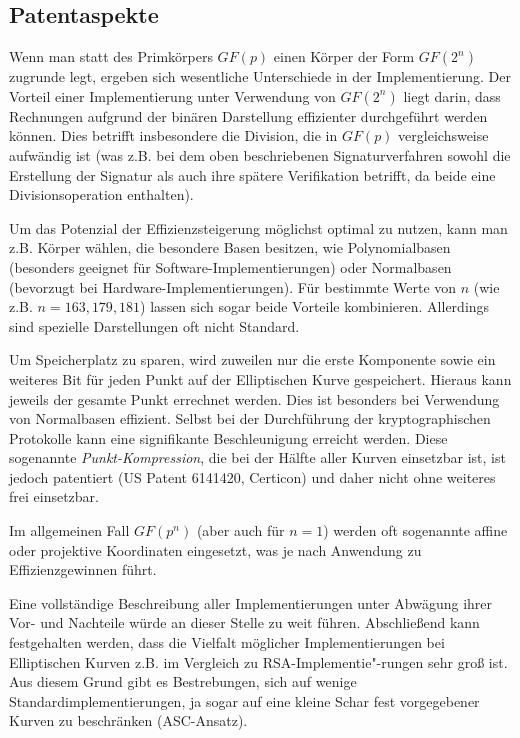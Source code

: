 \begin{refsegment}
\newpage
\section{Patentaspekte}

Wenn man statt des Primkörpers $GF(p)$ einen Körper der Form $GF(2^n)$ zugrunde legt, ergeben sich wesentliche Unterschiede in der Implementierung. Der Vorteil einer Implementierung unter Verwendung von $GF(2^n)$ liegt darin, dass Rechnungen aufgrund der binären Darstellung effizienter durchgeführt werden können. Dies betrifft insbesondere die Division, die in $GF(p)$ vergleichsweise aufwändig ist (was z.B. bei dem oben beschriebenen Signaturverfahren sowohl die Erstellung der Signatur als auch ihre spätere Verifikation betrifft, da beide eine Divisionsoperation enthalten).

Um das Potenzial der Effizienzsteigerung möglichst optimal zu nutzen, kann man z.B. Körper wählen, die besondere Basen besitzen, wie Polynomialbasen (besonders geeignet für Software-Implementierungen) oder Normalbasen (bevorzugt bei Hardware-Implementierungen). Für bestimmte Werte von $n$ (wie z.B. $n=163,179,181$) lassen sich sogar beide Vorteile kombinieren. Allerdings sind spezielle Darstellungen oft nicht Standard.

Um Speicherplatz zu sparen, wird zuweilen nur die erste Komponente sowie ein weiteres Bit für jeden Punkt auf der Elliptischen Kurve gespeichert. Hieraus kann jeweils der gesamte Punkt errechnet werden. Dies ist besonders bei Verwendung von Normalbasen effizient. Selbst bei der Durchführung der kryptographischen Protokolle kann eine signifikante Beschleunigung erreicht werden. Diese sogenannte {\it Punkt-Kompression}, die bei der Hälfte aller Kurven einsetzbar ist, ist jedoch patentiert (US Patent 6141420, Certicon) und daher nicht ohne weiteres frei einsetzbar.

Im allgemeinen Fall $GF(p^n)$ (aber auch für $n=1$) werden oft sogenannte affine oder projektive Koordinaten eingesetzt, was je nach Anwendung zu Effizienzgewinnen führt.

Eine vollständige Beschreibung aller Implementierungen unter Abwägung ihrer Vor- und Nachteile würde an dieser Stelle zu weit führen. Abschließend kann festgehalten werden, dass die Vielfalt möglicher Implementierungen bei Elliptischen Kurven z.B. im Vergleich zu RSA-Implementie"-rungen sehr groß ist. Aus diesem Grund gibt es Bestrebungen, sich auf wenige Standardimplementierungen, ja sogar auf eine kleine Schar fest vorgegebener Kurven zu beschränken (ASC-Ansatz).


\end{refsegment}
